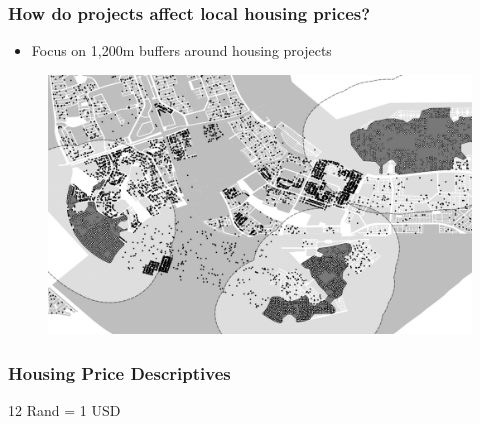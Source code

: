 \documentclass[aspectratio=149]{beamer}
\begin{document}

\begin{frame}
\frametitle{How do projects affect local housing prices?}
\begin{itemize}
  \item Focus on 1,200m buffers around housing projects
\end{itemize}
\begin{center}
\begin{figure}
\includegraphics[scale=0.30]{design2.png}
\vspace{-3mm}
\end{figure}
\end{center}
\end{frame}



\begin{frame}
\frametitle{Housing Price Descriptives}
\begin{center}
\resizebox{.95\textwidth}{!}{  

}
\end{center}
12 Rand = 1 USD
\end{frame}

\end{document}
